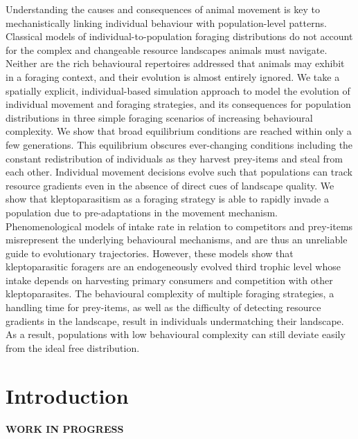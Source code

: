 \documentclass[11pt]{article}
\begin{document}
Understanding the causes and consequences of animal movement is key to mechanistically linking individual behaviour with population-level patterns.
Classical models of individual-to-population foraging distributions do not account for the complex and changeable resource landscapes animals must navigate.
Neither are the rich behavioural repertoires addressed that animals may exhibit in a foraging context, and their evolution is almost entirely ignored.
We take a spatially explicit, individual-based simulation approach to model the evolution of individual movement and foraging strategies, and its consequences for population distributions in three simple foraging scenarios of increasing behavioural complexity.
We show that broad equilibrium conditions are reached within only a few generations.
This equilibrium obscures ever-changing conditions including the constant redistribution of individuals as they harvest prey-items and steal from each other.
Individual movement decisions evolve such that populations can track resource gradients even in the absence of direct cues of landscape quality.
We show that kleptoparasitism as a foraging strategy is able to rapidly invade a population due to pre-adaptations in the movement mechanism.
Phenomenological models of intake rate in relation to competitors and prey-items misrepresent the underlying behavioural mechanisms, and are thus an unreliable guide to evolutionary trajectories.
However, these models show that kleptoparasitic foragers are an endogeneously evolved third trophic level whose intake depends on harvesting primary consumers and competition with other kleptoparasites.
The behavioural complexity of multiple foraging strategies, a handling time for prey-items, as well as the difficulty of detecting resource gradients in the landscape, result in individuals undermatching their landscape.
As a result, populations with low behavioural complexity can still deviate easily from the ideal free distribution.

\newpage{}

\section*{Introduction}

\textbf{WORK IN PROGRESS}

\end{document}
